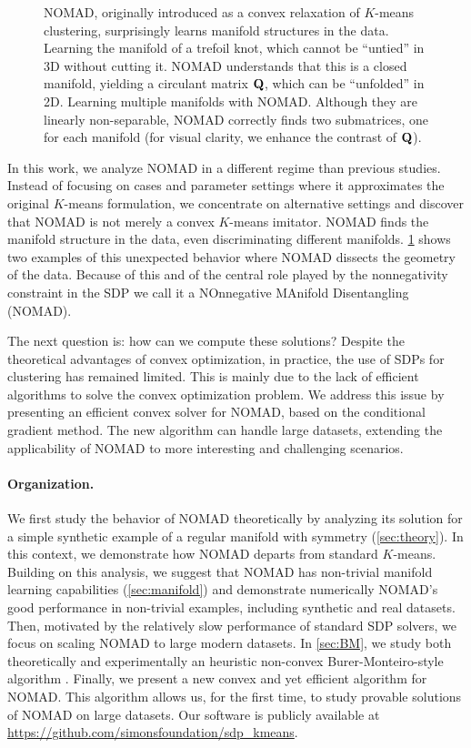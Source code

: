 \documentclass[twoside,11pt]{article}
\begin{document}
\begin{figure}
	\caption{NOMAD, originally introduced as a convex relaxation of $K$-means clustering, surprisingly learns manifold structures in the data.
	\protect{} Learning the manifold of a trefoil knot, which cannot be ``untied'' in 3D without cutting it. NOMAD understands that this is a closed manifold, yielding a circulant matrix ${\mathbf{Q}}$, which can be ``unfolded'' in 2D.
	\protect{} Learning multiple manifolds with NOMAD. Although they are linearly non-separable, NOMAD correctly finds two submatrices, one for each manifold (for visual clarity, we enhance the contrast of ${\mathbf{Q}}$).
	}
	\label{fig:opening}
\end{figure}

In this work, we analyze NOMAD in a different regime than previous studies. Instead of focusing on cases and parameter settings where it approximates the original $K$-means formulation, we concentrate on alternative settings and discover that NOMAD is not merely a convex $K$-means imitator.
NOMAD finds the manifold structure in the data, even discriminating different manifolds. \cref{fig:opening} shows two examples of this unexpected behavior where NOMAD dissects the geometry of the data. Because of this and of the central role played by the nonnegativity constraint in the SDP we call it a NOnnegative MAnifold Disentangling (NOMAD).

The next question is: how can we compute these solutions?
Despite the theoretical advantages of convex optimization, in practice, the use of SDPs for clustering has remained limited. This is mainly due to the lack of efficient algorithms to solve the convex optimization problem.
We address this issue by presenting an efficient convex solver for NOMAD, based on the conditional gradient method. The new algorithm can handle large datasets, extending the applicability of NOMAD to more interesting and challenging scenarios.

\paragraph{Organization.} 
We first study the behavior of NOMAD theoretically by analyzing its solution for a simple synthetic example of a regular manifold with symmetry (\cref{sec:theory}). In this context, we demonstrate how NOMAD departs from standard $K$-means.
Building on this analysis, we suggest that NOMAD has non-trivial manifold learning capabilities (\cref{sec:manifold}) and demonstrate numerically NOMAD's good performance in non-trivial examples, including synthetic and real datasets.
Then, motivated by the relatively slow performance of standard SDP solvers, we focus on scaling NOMAD to large modern datasets. In \cref{sec:BM}, we study both theoretically and experimentally an heuristic non-convex Burer-Monteiro-style algorithm \citep{Kulis2007}.
Finally, we present a new convex and yet efficient algorithm for NOMAD. This algorithm allows us, for the first time, to study provable solutions of NOMAD on large datasets.
Our software is publicly available at \url{https://github.com/simonsfoundation/sdp_kmeans}.
\end{document}
